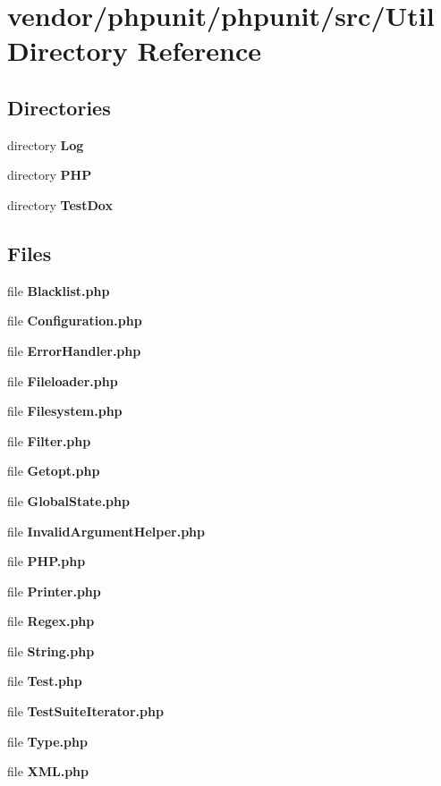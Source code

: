 \section{vendor/phpunit/phpunit/src/\+Util Directory Reference}
\label{dir_63e9dbd8b3fba11603e10b2fda64ee8a}
\subsection*{Directories}
\begin{DoxyCompactItemize}
\item 
directory {\bf Log}
\item 
directory {\bf P\+H\+P}
\item 
directory {\bf Test\+Dox}
\end{DoxyCompactItemize}
\subsection*{Files}
\begin{DoxyCompactItemize}
\item 
file {\bf Blacklist.\+php}
\item 
file {\bf Configuration.\+php}
\item 
file {\bf Error\+Handler.\+php}
\item 
file {\bf Fileloader.\+php}
\item 
file {\bf Filesystem.\+php}
\item 
file {\bf Filter.\+php}
\item 
file {\bf Getopt.\+php}
\item 
file {\bf Global\+State.\+php}
\item 
file {\bf Invalid\+Argument\+Helper.\+php}
\item 
file {\bf P\+H\+P.\+php}
\item 
file {\bf Printer.\+php}
\item 
file {\bf Regex.\+php}
\item 
file {\bf String.\+php}
\item 
file {\bf Test.\+php}
\item 
file {\bf Test\+Suite\+Iterator.\+php}
\item 
file {\bf Type.\+php}
\item 
file {\bf X\+M\+L.\+php}
\end{DoxyCompactItemize}
